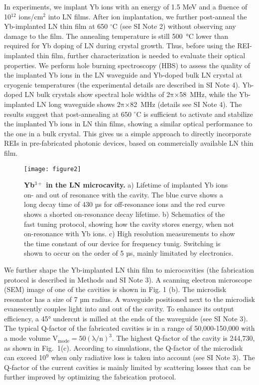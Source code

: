 \documentclass[prl,reprint,superscriptaddress]{revtex4-1}
\begin{document}
      
In  experiments, we implant Yb ions with an energy of 1.5 MeV and a fluence of 10$\mathrm{^{12}}$ ions/cm$\mathrm{^{2}}$ into LN films. After ion implantation, we further post-anneal the Yb-implanted LN thin film at 650 $^{\circ}$C (see SI Note 2) without observing any damage to the film. The annealing temperature is still 500~°C lower than required for Yb doping of LN during crystal growth. Thus, before using the REI-implanted thin film, further characterization is needed to evaluate their optical properties. We perform hole burning spectroscopy (HBS) to assess the quality of the implanted Yb ions in the LN waveguide and Yb-doped bulk LN crystal at cryogenic temperatures (the experimental details are described in SI Note 4). Yb-doped LN bulk crystals show spectral hole widths of 2$\mathrm{\pi}$×58~MHz, while the Yb-implanted LN long waveguide shows 2$\mathrm{\pi}$×82~MHz (details see SI Note 4). The results suggest that post-annealing at 650 $^{\circ}$C is sufficient to activate and stabilize the implanted Yb ions in LN thin films, showing a similar optical performance to the one in a bulk crystal. This gives us a simple approach to directly incorporate REIs in pre-fabricated photonic devices, based on commercially available LN thin film. 

  \begin{figure*}
\texttt{[image: figure2]}%
\caption{ \textbf{Yb$\mathrm{^{3+}}$ in the LN microcavity.} a) Lifetime of implanted Yb ions on- and out of resonance with the cavity. The blue curve shows a long decay time of 430 µs for off-resonance ions and the red curve shows a shorted on-resonance decay lifetime. b) Schematics of the fast tuning protocol, showing how the cavity stores energy, when not on-resonance with Yb ions. c) High resolution measurements to show the time constant of our device for frequency tunig. Switching is shown to occur on the order of 5 µs, mainly limitated by electronics.  \label{figure2}}
\end{figure*}  


We further shape the Yb-implanted LN thin film to microcavities (the fabrication protocol is described in Methods and SI Note 3). A scanning electron microscope (SEM) image of one of the cavities is shown in Fig. 1 (b). The microdisk resonator has a size of 7 µm radius. A waveguide positioned next to the microdisk evanescently couples light into and out of the cavity. To enhance its output efficiency, a 45° undercut is milled at the ends of the waveguide (see SI Note 3). The typical Q-factor of the  fabricated cavities is in a range of 50,000-150,000 with a mode volume $\mathrm{V_{mode}=50(\lambda/n)^3}$. The highest Q-factor of the cavity is 244,730, as shown in Fig.~1(c). According to simulations, the Q-factor of the microdisk can exceed 10$^9$ when only radiative loss is taken into account (see SI Note 3). The Q-factor of the current cavities is mainly limited by scattering losses that can be further improved by optimizing the fabrication protocol.
\end{document}
